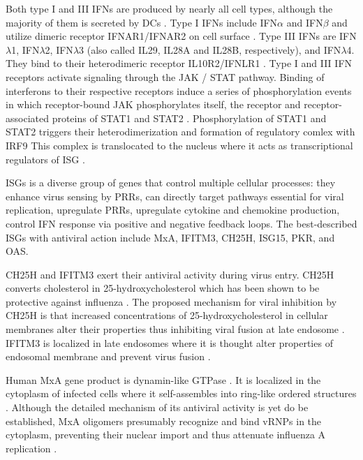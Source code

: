 		Both type I and III \gls{IFN}s are produced by nearly all cell types, although the majority of them is secreted by \gls{DC}s \parencite{Siegal1999, Odendall2014}. Type I \gls{IFN}s include \gls{IFN}$\alpha$ and \gls{IFN}$\beta$ and utilize dimeric receptor IFNAR1/IFNAR2 on cell surface \parencite{Mogensen1999}. Type III \gls{IFN}s are \gls{IFN}$\lambda$1, \gls{IFN}$\lambda$2, \gls{IFN}$\lambda$3 (also called \gls{IL}29, \gls{IL}28A and \gls{IL}28B, respectively), and \gls{IFN}$\lambda$4. They bind to their heterodimeric receptor IL10R2/IFNLR1 \parencite{Kotenko2003, Sheppard2003}. Type I and III \gls{IFN} receptors activate signaling through the \gls{JAK} / \gls{STAT} pathway. Binding of interferons to their respective receptors induce a series of phosphorylation events in which receptor-bound \gls{JAK} phosphorylates itself, the receptor and receptor-associated proteins of \gls{STAT}1 and \gls{STAT}2 \parencite{VanBoxel-Dezaire2006}. Phosphorylation of \gls{STAT}1 and \gls{STAT}2 triggers their heterodimerization and formation of regulatory comlex with \gls{IRF}9 \parencite{Fu1990} This complex is translocated to the nucleus where it acts as transcriptional regulators of \gls{ISG} \parencite{Levy1988}.
		
		\gls{ISG}s is a diverse group of genes that control multiple cellular processes: they enhance virus sensing by \gls{PRR}s, can directly target pathways essential for viral replication, upregulate \gls{PRR}s, upregulate cytokine and chemokine production, control \gls{IFN} response via positive and negative feedback loops. The best-described \gls{ISG}s with antiviral action include \gls{MxA}, \gls{IFITM3}, \gls{CH25H}, \gls{ISG15}, \gls{PKR}, and \gls{OAS}. 
		
		\gls{CH25H} and \gls{IFITM3} exert their antiviral activity during virus entry. \gls{CH25H} converts cholesterol in 25-hydroxycholesterol which has been shown to be protective against influenza \parencite{Blanc2013}. The proposed mechanism for viral inhibition by \gls{CH25H} is that increased concentrations of 25-hydroxycholesterol in cellular membranes alter their properties thus inhibiting viral fusion at late endosome \parencite{Liu2013}. \gls{IFITM3} is localized in late endosomes where it is thought alter properties of endosomal membrane and prevent virus fusion \parencite{Li2013, Desai2014}. 
				
		Human \gls{MxA} gene product is dynamin-like \gls{GTPase} \parencite{Nakayama1992}. It is localized in the cytoplasm of infected cells where it self-assembles into ring-like ordered structures \parencite{Gao2010}. Although the detailed mechanism of its antiviral activity is yet do be established, \gls{MxA} oligomers presumably recognize and bind \gls{vRNP}s in the cytoplasm, preventing their nuclear import and thus attenuate influenza A replication \parencite{Haller2010}.
		
